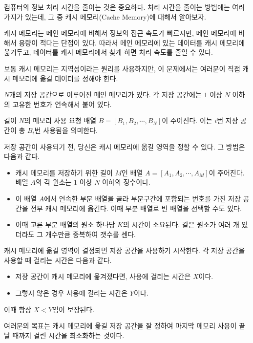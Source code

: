 컴퓨터의 정보 처리 시간을 줄이는 것은 중요하다. 처리 시간을 줄이는 방법에는 여러 가지가 있는데, 그 중 캐시 메모리(Cache Memory)에 대해서 알아보자.

캐시 메모리는 메인 메모리에 비해서 정보의 접근 속도가 빠르지만, 메인 메모리에 비해서 용량이 적다는 단점이 있다. 따라서 메인 메모리에 있는 데이터를 캐시 메모리에 옮겨두고, 데이터를 캐시 메모리에서 찾게 하면 처리 속도를 줄일 수 있다.

보통 캐시 메모리는 지역성이라는 원리를 사용하지만, 이 문제에서는 여러분이 직접 캐시 메모리에 옮길 데이터를 정해야 한다.

$N$개의 저장 공간으로 이루어진 메인 메모리가 있다. 각 저장 공간에는 $1$ 이상 $N$ 이하의 고유한 번호가 연속해서 붙어 있다.

길이 $N$의 메모리 사용 요청 배열 $B=[B_1, B_2, \cdots, B_N]$이 주어진다. 이는 $i$번 저장 공간이 총 $B_i$번 사용됨을 의미한다.

저장 공간이 사용되기 전, 당신은 캐시 메모리에 옮길 영역을 정할 수 있다. 그 방법은 다음과 같다.
\begin {itemize}
\item 캐시 메모리를 저장하기 위한 길이 $M$인 배열 $A=[A_1, A_2, \cdots, A_M]$이 주어진다. 배열 $A$의 각 원소는 $1$ 이상 $N$ 이하의 정수이다.
\item 이 배열 $A$에서 연속한 부분 배열을 골라 부분구간에 포함되는 번호를 가진 저장 공간을 전부 캐시 메모리에 옮긴다. 이때 부분 배열로 빈 배열을 선택할 수도 있다.
\item 이때 고른 부분 배열의 원소 하나당 $K$의 시간이 소요된다. 같은 원소가 여러 개 있더라도 그 개수만큼 중복하여 갯수를 센다.
\end{itemize}

캐시 메모리에 옮길 영역이 결정되면 저장 공간을 사용하기 시작한다. 각 저장 공간을 사용할 때 걸리는 시간은 다음과 같다.
\begin{itemize}
\item 저장 공간이 캐시 메모리에 옮겨졌다면, 사용에 걸리는 시간은 $X$이다.
\item 그렇지 않은 경우 사용에 걸리는 시간은 $Y$이다.
\end{itemize}

이때 항상 $X < Y$임이 보장된다.

여러분의 목표는 캐시 메모리에 옮길 저장 공간을 잘 정하여 마지막 메모리 사용이 끝날 때까지 걸린 시간을 최소화하는 것이다.